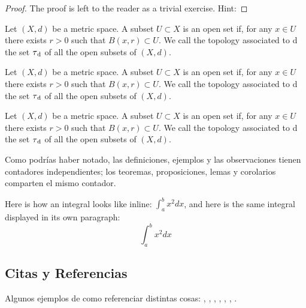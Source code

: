 \begin{proof}
    The proof is left to the reader as a trivial exercise. Hint: \blindtext
\end{proof}

\begin{definition}
Let $(X, d)$ be a metric space. A subset $U \subset X$ is an open set if, for any $x \in U$ there exists $r > 0$ such that $B(x, r) \subset U$. We call the topology associated to d the set $\tau\textsubscript{d}$ of all the open subsets of $(X, d).$
\end{definition}

\begin{example}
    Let $(X, d)$ be a metric space. A subset $U \subset X$ is an open set if, for any $x \in U$ there exists $r > 0$ such that $B(x, r) \subset U$. We call the topology associated to d the set $\tau\textsubscript{d}$ of all the open subsets of $(X, d).$
\end{example}

\begin{remark}
    Let $(X, d)$ be a metric space. A subset $U \subset X$ is an open set if, for any $x \in U$ there exists $r > 0$ such that $B(x, r) \subset U$. We call the topology associated to d the set $\tau\textsubscript{d}$ of all the open subsets of $(X, d).$
\end{remark}

Como podrías haber notado, las definiciones, ejemplos y las observaciones tienen contadores independientes; los teoremas, proposiciones, lemas y corolarios comparten el mismo contador.

\begin{remark}
    Here is how an integral looks like inline: $\int_{a}^{b} x^2 dx$, and here is the same integral displayed in its own paragraph: \[\int_{a}^{b} x^2 dx\]
\end{remark}

\subsection{Citas y Referencias}
Algunos ejemplos de como referenciar distintas cosas: , , , , , , . 

